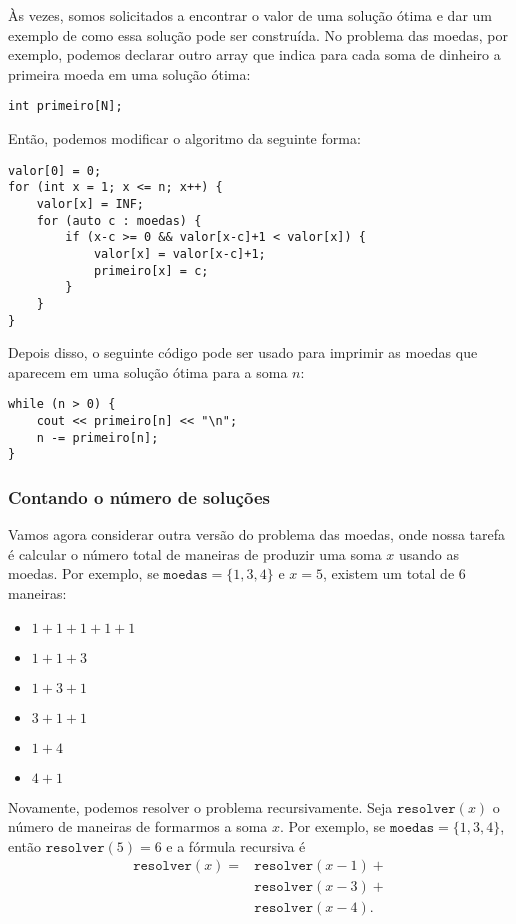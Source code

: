 Às vezes, somos solicitados a encontrar o valor
de uma solução ótima e dar
um exemplo de como essa solução pode ser construída.
No problema das moedas, por exemplo,
podemos declarar outro array
que indica para
cada soma de dinheiro a primeira moeda
em uma solução ótima:
\begin{lstlisting}
int primeiro[N];
\end{lstlisting}
Então, podemos modificar o algoritmo da seguinte forma:
\begin{lstlisting}
valor[0] = 0;
for (int x = 1; x <= n; x++) {
    valor[x] = INF;
    for (auto c : moedas) {
        if (x-c >= 0 && valor[x-c]+1 < valor[x]) {
            valor[x] = valor[x-c]+1;
            primeiro[x] = c;
        }
    }
}
\end{lstlisting}
Depois disso, o seguinte código pode ser usado para
imprimir as moedas que aparecem em uma solução ótima para
a soma $n$:
\begin{lstlisting}
while (n > 0) {
    cout << primeiro[n] << "\n";
    n -= primeiro[n];
}
\end{lstlisting}

\subsubsection{Contando o número de soluções}

Vamos agora considerar outra versão
do problema das moedas, onde nossa tarefa é
calcular o número total de maneiras
de produzir uma soma $x$ usando as moedas.
Por exemplo, se $\texttt{moedas}=\{1,3,4\}$ e
$x=5$, existem um total de 6 maneiras:

\begin{multicols}{2}
\begin{itemize}
\item $1+1+1+1+1$
\item $1+1+3$
\item $1+3+1$
\item $3+1+1$
\item $1+4$
\item $4+1$
\end{itemize}
\end{multicols}

Novamente, podemos resolver o problema recursivamente.
Seja $\texttt{resolver}(x)$ o número de maneiras
de formarmos a soma $x$.
Por exemplo, se $\texttt{moedas}=\{1,3,4\}$,
então $\texttt{resolver}(5)=6$ e a fórmula recursiva é
\begin{equation*}
\begin{split}
\texttt{resolver}(x) = & \texttt{resolver}(x-1) + \\
                    & \texttt{resolver}(x-3) + \\
                    & \texttt{resolver}(x-4)  .
\end{split}
\end{equation*}

